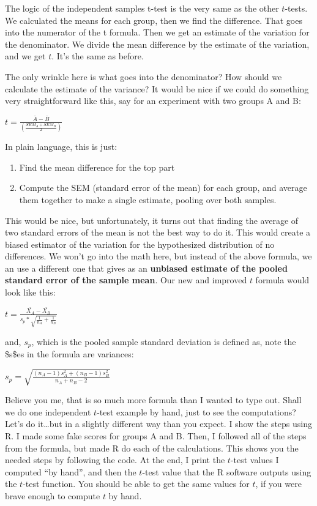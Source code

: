 \documentclass[
  letterpaper,
  DIV=11,
  numbers=noendperiod]{scrreprt}
\providecommand{\tightlist}{%
  \setlength{\itemsep}{0pt}\setlength{\parskip}{0pt}}
\begin{document}
The logic of the independent samples t-test is the very same as the
other \(t\)-tests. We calculated the means for each group, then we find
the difference. That goes into the numerator of the t formula. Then we
get an estimate of the variation for the denominator. We divide the mean
difference by the estimate of the variation, and we get \(t\). It's the
same as before.

The only wrinkle here is what goes into the denominator? How should we
calculate the estimate of the variance? It would be nice if we could do
something very straightforward like this, say for an experiment with two
groups A and B:

\(t = \frac{\bar{A}-\bar{B}}{(\frac{SEM_A+SEM_B}{2})}\)

In plain language, this is just:

\begin{enumerate}
\def\labelenumi{\arabic{enumi}.}
\tightlist
\item
  Find the mean difference for the top part
\item
  Compute the SEM (standard error of the mean) for each group, and
  average them together to make a single estimate, pooling over both
  samples.
\end{enumerate}

This would be nice, but unfortunately, it turns out that finding the
average of two standard errors of the mean is not the best way to do it.
This would create a biased estimator of the variation for the
hypothesized distribution of no differences. We won't go into the math
here, but instead of the above formula, we an use a different one that
gives as an \textbf{unbiased estimate of the pooled standard error of
the sample mean}. Our new and improved \(t\) formula would look like
this:

\(t = \frac{\bar{X_A}-\bar{X_B}}{s_p * \sqrt{\frac{1}{n_A} + \frac{1}{n_B}}}\)

and, \(s_p\), which is the pooled sample standard deviation is defined
as, note the \$s\$es in the formula are variances:

\(s_p = \sqrt{\frac{(n_A-1)s_A^2 + (n_B-1)s^2_B}{n_A +n_B -2}}\)

Believe you me, that is so much more formula than I wanted to type out.
Shall we do one independent \(t\)-test example by hand, just to see the
computations? Let's do it\ldots but in a slightly different way than you
expect. I show the steps using R. I made some fake scores for groups A
and B. Then, I followed all of the steps from the formula, but made R do
each of the calculations. This shows you the needed steps by following
the code. At the end, I print the \(t\)-test values I computed ``by
hand'', and then the \(t\)-test value that the R software outputs using
the \(t\)-test function. You should be able to get the same values for
\(t\), if you were brave enough to compute \(t\) by hand.
\end{document}
